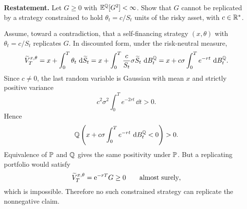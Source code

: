 \begin{exercise}
\textbf{Restatement.}
Let \(G\ge0\) with \(\EQ[G^2]<\infty\).  Show that \(G\) cannot be replicated by
a strategy constrained to hold \(\theta_t=c/S_t\) units of the risky
asset, with \(c\in\R^*\).

\begin{solution}
Assume, toward a contradiction, that a self-financing strategy
\((x,\theta)\) with \(\theta_t=c/S_t\) replicates \(G\).  In discounted
form, under the risk-neutral measure,
\[
  \Vtilde_T^{x,\theta}
    =x+\int_0^T\theta_t\,\dd\Stilde_t
    =x+\int_0^T\frac{c}{S_t}\sigma\Stilde_t\,\dd B_t^\Q
    =x+c\sigma\int_0^T e^{-rt}\,\dd B_t^\Q.
\]
Since \(c\ne0\), the last random variable is Gaussian with mean \(x\) and
strictly positive variance
\[
  c^2\sigma^2\int_0^T e^{-2rt}\,\dd t>0.
\]
Hence
\[
  \Q\left(x+c\sigma\int_0^T e^{-rt}\,\dd B_t^\Q<0\right)>0.
\]
Equivalence of \(\P\) and \(\Q\) gives the same positivity under \(\P\).
But a replicating portfolio would satisfy
\[
  \Vtilde_T^{x,\theta}=\e^{-rT}G\ge0
  \qquad\text{almost surely},
\]
which is impossible.  Therefore no such constrained strategy can replicate
the nonnegative claim.
\end{solution}
\end{exercise}
